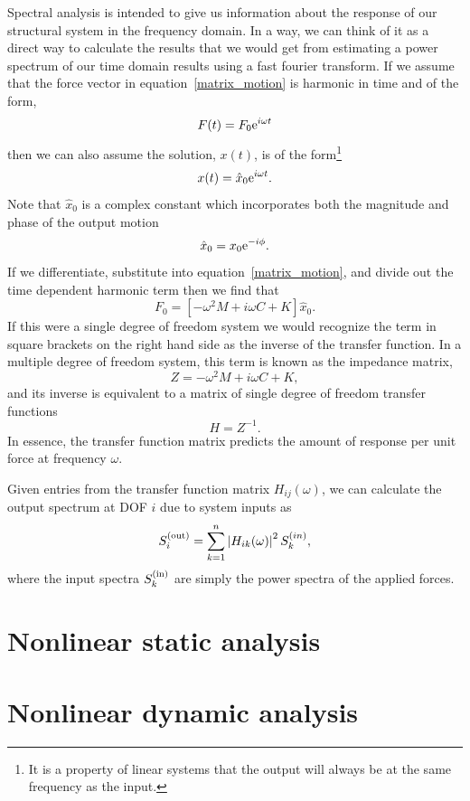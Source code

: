 Spectral analysis is intended to give us information about the response
of our structural system in the frequency domain.  In a way, we can think
of it as a direct way to calculate the results that we would get from
estimating a power spectrum of our time domain results using a fast
fourier transform.  If we assume that the force vector in 
equation~\ref{matrix_motion} is harmonic in time and of the form,
\begin{equation}
F(t) = {F_{0} {\rm e}^{i \omega t}}
\end{equation}
then we can also assume the solution, $x(t)$, is of the form\footnote{It is
a property of linear systems that the output will always be at the same
frequency as the input.}
\begin{equation}
x(t) = {{\hat x}_{0} {\rm e}^{i \omega t}}.
\end{equation}
Note that ${\hat x}_{0}$ is a complex constant which incorporates both the
magnitude and phase of the output motion
\begin{equation}
{{\hat x}_{0}} = {x_{0} {\rm e}^{-i \phi}}.
\end{equation}
If we differentiate, substitute into equation~\ref{matrix_motion}, and
divide out the time dependent harmonic term then we find that
\begin{equation}
{F_{0}} = {\left[{-\omega^{2} M + i \omega C + K}\right] {\hat x}_{0}}.
\end{equation}
If this were a single degree of freedom system we would recognize the
term in square brackets on the right hand side as the inverse of the
transfer function.  In a multiple degree of freedom system, this term is known
as the impedance matrix,
\begin{equation}
{Z} = -\omega^{2} M + i \omega C + K,
\end{equation}
and its inverse is equivalent to a matrix of single degree of freedom
transfer functions
\begin{equation}
{H} = {Z}^{-1}.
\end{equation}
In essence, the transfer function matrix predicts the amount of response
per unit force at frequency $\omega$. 

Given entries from the transfer function matrix $H_{ij}(\omega)$, we can
calculate the output spectrum at DOF $i$ due to system inputs as
\begin{equation}
{S_{i}^{\rm (out)}} = {\sum_{k = 1}^{n} \left|{H_{ik}(\omega)}\right|^{2} S_{k}^{(in)}},
\end{equation}
where the input spectra $S_{k}^{\rm (in)}$ are simply the power spectra of the
applied forces.

\section{Nonlinear static analysis}

\section{Nonlinear dynamic analysis}

